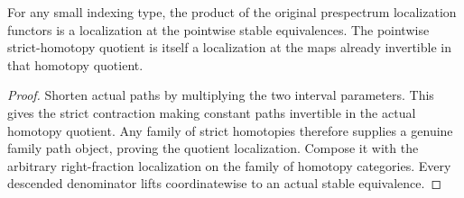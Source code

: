 \begin{proposition}
  \label{prop:actual-source-family-localization}
  \leanok
  For any small indexing type, the product of the original prespectrum localization functors is a localization at the pointwise stable equivalences. The pointwise strict-homotopy quotient is itself a localization at the maps already invertible in that homotopy quotient.
\end{proposition}
\begin{proof}
  Shorten actual paths by multiplying the two interval parameters. This gives the strict contraction making constant paths invertible in the actual homotopy quotient. Any family of strict homotopies therefore supplies a genuine family path object, proving the quotient localization. Compose it with the arbitrary right-fraction localization on the family of homotopy categories. Every descended denominator lifts coordinatewise to an actual stable equivalence.
  \leanok
\end{proof}

